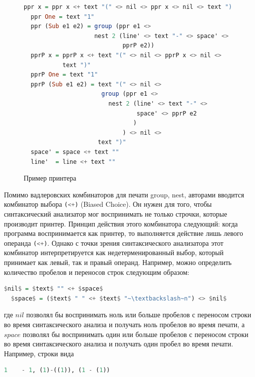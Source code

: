 \begin{figure}[h]
\centering
\begin{lstlisting}[language=Haskell]
  ppr x = ppr x <+ text "(" <> nil <> ppr x <> nil <> text ")"
  ppr One = text "1"
  ppr (Sub e1 e2) = group (ppr e1 <> 
                    nest 2 (line' <> text "-" <> space' <> 
                            pprP e2))
  pprP x = pprP x <+ text "(" <> nil <> pprP x <> nil <> 
           text ")"
  pprP One = text "1"
  pprP (Sub e1 e2) = text "(" <> nil <> 
                      group (ppr e1 <> 
                        nest 2 (line' <> text "-" <> 
                                space' <> pprP e2
                               )
                            ) <> nil <> 
                     text ")"
  space' = space <+ text ""
  line'  = line <+ text "" 
\end{lstlisting}
\caption{Пример принтера}
\label{printer_example}
\end{figure}

Помимо вадлеровских комбинаторов для печати group, nest, авторами вводится комбинатор выбора 
\lstinline[language=Haskell]{(<+)} (Biased Choice). Он нужен для того, чтобы синтаксический 
анализатор мог воспринимать не только строчки, которые производит принтер. Принцип действия 
этого комбинатора следующий: когда программа воспринимается как принтер, то выполняется 
действие лишь левого операнда \lstinline[language=Haskell]{(<+)}. Однако с точки зрения 
синтаксического анализатора этот комбинатор интерпретируется как недетерменированный выбор, 
который принимает как левый, так и правый операнд. Например, можно определить количество 
пробелов и переносов строк следующим образом:

\begin{lstlisting}[language=Haskell,mathescape]
  $nil$ = $text$ "" <+ $space$
  $space$ = ($text$ " " <+ $text$ "~\textbackslash~n") <> $nil$
\end{lstlisting}

\noindent где $nil$ позволял бы воспринимать ноль или больше пробелов с переносом строки во 
время синтаксического анализа и получать ноль пробелов во время печати, а  $space$ позволял 
бы воспринимать один или больше пробелов с переносом строки во время синтаксического 
анализа и получать один пробел во время печати. Например, строки вида 

\begin{lstlisting}[language=Haskell]
   1    - 1, (1)-((1)), (1 - (1))
\end{lstlisting} 

